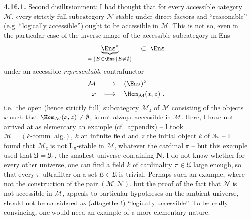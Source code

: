 \textbf{4.16.1.} Second disillusionment: I had thought that for every accessible category $\mathcal{M}$, every %
strictly full subcategory $\mathcal{N}$ stable under direct factors and ``reasonable'' (e.g. ``logically accessible'') ought to be accessible in $\mathcal{M}$. This is not so, even in the particular case of the inverse image of the accessible subcategory in Ens
\[
\underbrace{\Ens^*}_{=\,\{E\,\in\Ens\,\mid\, E\neq\emptyset\}} \quad\subset\ \Ens
\]
under an accessible \textit{representable} contrafunctor
\[
\begin{aligned}
\mathcal{M} \quad &\longrightarrow \quad (\Ens)^\circ \\
x \quad &\longmapsto \quad \Hom_{\mathcal{M}}(x,z)\ ,
\end{aligned}
\]
i.e.\ the open (hence strictly full) subcategory $\mathcal{M}_z$ of $\mathcal{M}$ consisting of the objects $x$ such that $\Hom_{\mathcal{M}}(x,z) \neq \emptyset$, is not always accessible in $\mathcal{M}$. Here, I have not arrived at %
as elementary an example (cf.\ appendix) -- I took $\mathcal{M} = (k\text{-comm.\ alg.})$, $k$ an infinite field and $z$ the initial object $k$ of $\mathcal{M}$ -- I found that $\mathcal{M}_z$ is not $\mathrm{L}_\pi$-stable in $\mathcal{M}$, whatever the cardinal $\pi$ %
-- but this example used that $\mathfrak{U} = \mathfrak{U}_1$, the smallest universe containing $\mathbf{N}$. I do not know whether for every other universe, one can find a field $k$ of cardinality $\pi \in \mathfrak{U}$ large enough, so that every $\pi$-ultrafilter on a set $E \in \mathfrak{U}$ is trivial. Perhaps
such an example, where not the construction of the pair $(\mathcal{M},\mathcal{N})$, but the proof of the fact that $\mathcal{N}$ is not accessible in $\mathcal{M}$, appeals to particular hypotheses on the ambient universe, should not be considered as (altogether!) ``logically accessible''. To be really convincing, one would need an example of a more elementary nature.

